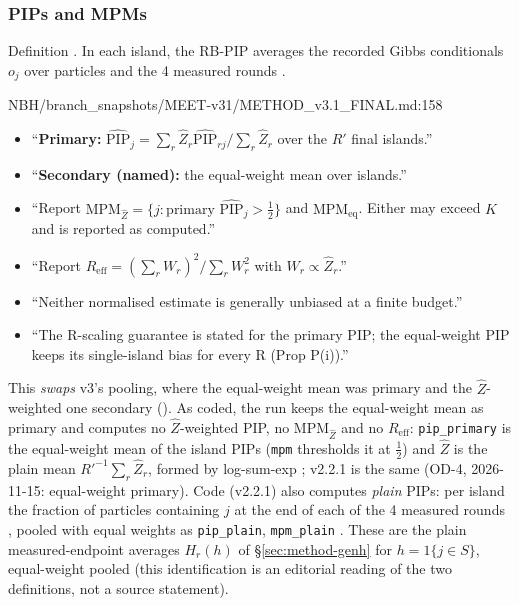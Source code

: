 \subsubsection{PIPs and MPMs}
Definition . In each island, the RB-PIP averages the recorded Gibbs conditionals $o_j$ over particles and the 4
measured rounds .
\begin{stmt}{NBH/branch_snapshots/MEET-v31/METHOD_v3.1_FINAL.md:158}
\begin{itemize}
\item ``\textbf{Primary:} $\widehat{\mathrm{PIP}}_j=\sum_r\hat Z_r\widehat{\mathrm{PIP}}_{rj}/\sum_r\hat Z_r$ over the $R'$ final islands.''
\item ``\textbf{Secondary (named):} the equal-weight mean over islands.''
\item ``Report $\mathrm{MPM}_{\hat Z}=\{j:\text{primary }\widehat{\mathrm{PIP}}_j>\tfrac12\}$ and $\mathrm{MPM}_{\mathrm{eq}}$. Either may exceed $K$ and
  is reported as computed.''
\item ``Report $R_{\mathrm{eff}}=(\sum_rW_r)^2/\sum_rW_r^2$ with $W_r\propto\hat Z_r$.''
\item ``Neither normalised estimate is generally unbiased at a finite budget.''
\item ``The R-scaling guarantee is stated for the primary PIP; the equal-weight PIP keeps its single-island bias for every R (Prop P(i)).''
\end{itemize}
\end{stmt}
This \emph{swaps} v3's pooling, where the equal-weight mean was primary and the $\hat Z$-weighted one secondary
 (). As coded, the run keeps the equal-weight mean as primary and computes no $\hat Z$-weighted PIP, no $\mathrm{MPM}_{\hat Z}$ and no $R_{\mathrm{eff}}$: \texttt{pip\_primary} is the equal-weight mean of the island PIPs (\texttt{mpm} thresholds it at $\tfrac12$) and $\hat Z$ is the plain mean $R'^{-1}\sum_r\hat Z_r$, formed by log-sum-exp ; v2.2.1 is the same  (OD-4, 2026-11-15: equal-weight primary). Code (v2.2.1) also computes \emph{plain} PIPs: per island the
fraction of particles containing $j$ at the end of each of the 4 measured rounds
, pooled with equal weights as
\texttt{pip\_plain}, \texttt{mpm\_plain} .
These are the plain measured-endpoint averages $H_r(h)$ of \S\ref{sec:method-genh} for $h=1\{j\in S\}$, equal-weight pooled
(this identification is an editorial reading of the two definitions, not a source statement).

